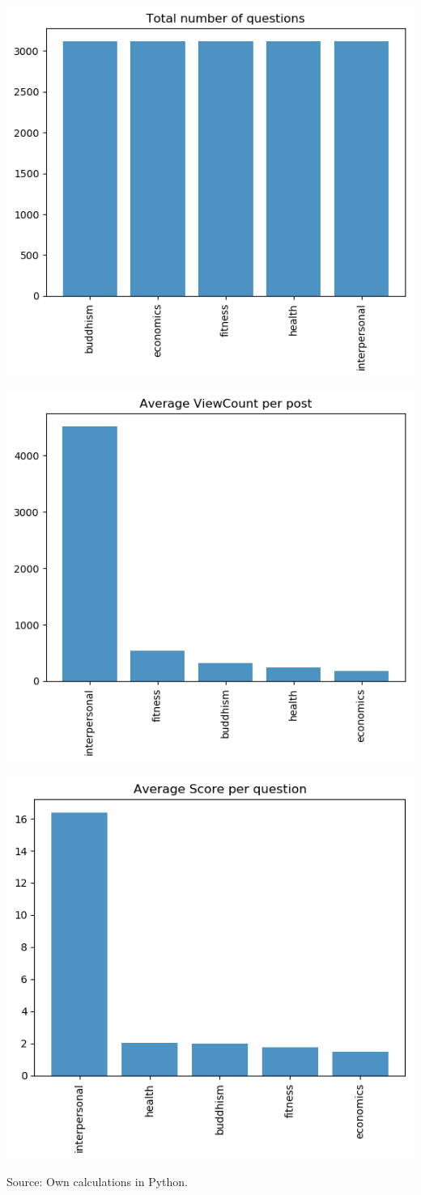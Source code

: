 \documentclass[11pt,preprint, authoryear]{article}
\let\origfigure\figure
\let\endorigfigure\endfigure
\renewenvironment{figure}[1][2] {
    \expandafter\origfigure\expandafter[H]
} {
    \endorigfigure
}
\numberwithin{equation}{section}
\numberwithin{figure}{section}
\numberwithin{table}{section}
\begin{document}
\begin{figure}
\caption{\textbf{Fora Descriptive Statistics}}
\label{fig:desc}

\begin{center}\includegraphics[width=0.5\linewidth]{../../01-python-code/00-workspace/01-graphs/post-counts-bar-graph} \end{center}



\begin{center}\includegraphics[width=0.5\linewidth]{../../01-python-code/00-workspace/01-graphs/ave-views-bar-graph} \end{center}



\begin{center}\includegraphics[width=0.5\linewidth]{../../01-python-code/00-workspace/01-graphs/ave-score-bar-graph} \end{center}
\centering
{\footnotesize Source: Own calculations in Python.}
\end{figure}
\end{document}
